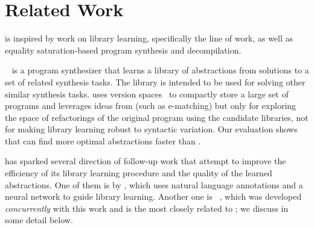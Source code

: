\section{Related Work}
\label{sec:related}

\tool is inspired by work on library learning,
specifically the \dc line of work,
as well as equality saturation-based program synthesis and decompilation.

\mypara{\dc}
%
\dc~\cite{dreamcoder} is a program synthesizer
  that learns a library of abstractions
  from solutions to a set of related synthesis tasks.
The library is intended to be used for solving other
  similar synthesis tasks.
\dc
  uses version spaces~\cite{vsa1, vsa2}
  to compactly store a large
  set of programs
  and leverages ideas from \egraphs
  (such as e-matching)
  but only for exploring the space of refactorings
  of the original program using the candidate libraries,
  not for making library learning robust to syntactic variation.
%
Our evaluation shows that \tool can find more optimal abstractions faster than \dc.

\dc has sparked several direction of follow-up work
that attempt to improve the efficiency of its library learning procedure
and the quality of the learned abstractions.
%
One of them is by \citet{laps},
which uses natural language annotations and a neural network
to guide library learning.
%
Another one is \stitch~\cite{stitch},
which was developed \emph{concurrently} with this work
and is the most closely related to \tool;
we discuss \stitch in some detail below.

